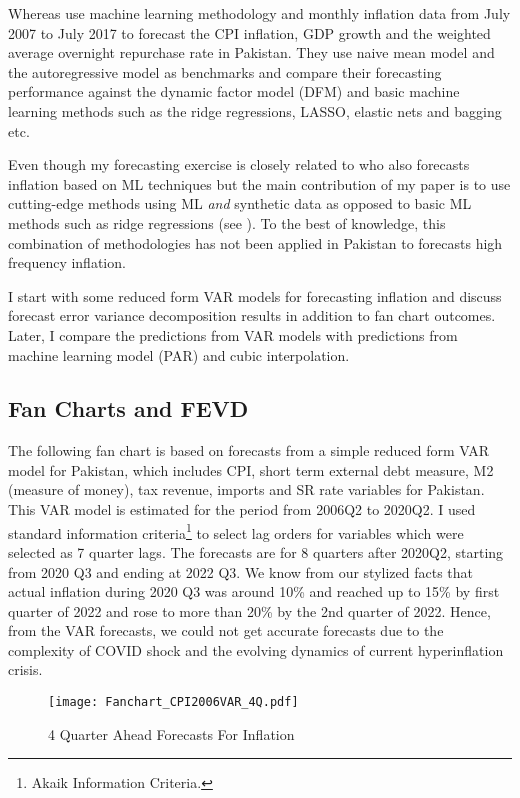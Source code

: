 \documentclass[12pt]{article}
\newcommand{\1}{\mathbbm 1}
\begin{document}
		Whereas \cite{syed2021macroeconomic} use machine learning methodology and monthly inflation data from July 2007 to July 2017 to forecast the CPI inflation, GDP growth and the weighted average overnight repurchase rate in Pakistan. They use naive mean model and the autoregressive model as benchmarks and compare their forecasting performance against the dynamic factor model (DFM) and basic machine learning methods such as the ridge regressions, LASSO, elastic nets and bagging etc.
		
		 
		
		Even though my forecasting exercise is closely related to \cite{syed2021macroeconomic} who also forecasts inflation based on ML techniques but the main contribution of my paper is to use cutting-edge methods using ML \textit{and} synthetic data as opposed to basic ML methods such as ridge regressions (see \cite{syed2021macroeconomic}). To the best of knowledge, this combination of methodologies has not been applied in Pakistan to forecasts high frequency inflation.
		
		I start with some reduced form VAR models for forecasting inflation and discuss forecast error variance decomposition results in addition to fan chart outcomes. Later, I compare the predictions from VAR models with predictions from machine learning model (PAR) and cubic interpolation.
		
		\subsection{Fan Charts and FEVD}
			
		The following fan chart is based on forecasts from a simple reduced form VAR model for Pakistan, which includes CPI, short term external debt measure, M2 (measure of money), tax revenue, imports and SR rate variables for Pakistan. This VAR model is estimated for the period from 2006Q2 to 2020Q2. I used standard information criteria\footnote{Akaik Information Criteria.} to select lag orders for variables which were selected as 7 quarter lags. The forecasts are for 8 quarters after 2020Q2, starting from 2020 Q3 and ending at 2022 Q3. We know from our stylized facts that actual inflation during 2020 Q3 was around 10\% and reached up to 15\% by first quarter of 2022 and rose to more than 20\% by the 2nd quarter of 2022. Hence, from the VAR forecasts, we could not get accurate forecasts due to the complexity of COVID shock and the evolving dynamics of current hyperinflation crisis.
		
		
		\begin{figure}[H]
			\begin{Center}
				\texttt{[image: Fanchart\_CPI2006VAR\_4Q.pdf]}
				\caption{4 Quarter Ahead Forecasts For Inflation}
			\end{Center}
		\end{figure}
	
\end{document}
